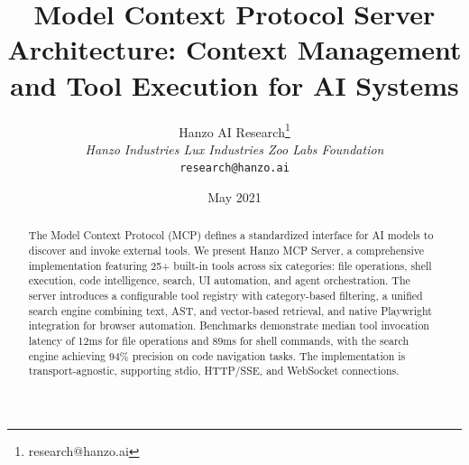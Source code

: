 \documentclass[11pt,twocolumn]{article}
\title{Model Context Protocol Server Architecture: Context Management and Tool Execution for AI Systems}
\author{Hanzo AI Research\thanks{research@hanzo.ai} \\ \textit{Hanzo Industries \quad Lux Industries \quad Zoo Labs Foundation} \\ \texttt{research@hanzo.ai}}
\date{May 2021}
\begin{document}
\hanzocoverpage

\begin{abstract}
The Model Context Protocol (MCP) defines a standardized interface for AI models to discover and invoke external tools. We present Hanzo MCP Server, a comprehensive implementation featuring 25+ built-in tools across six categories: file operations, shell execution, code intelligence, search, UI automation, and agent orchestration. The server introduces a configurable tool registry with category-based filtering, a unified search engine combining text, AST, and vector-based retrieval, and native Playwright integration for browser automation. Benchmarks demonstrate median tool invocation latency of 12ms for file operations and 89ms for shell commands, with the search engine achieving 94\% precision on code navigation tasks. The implementation is transport-agnostic, supporting stdio, HTTP/SSE, and WebSocket connections.
\end{abstract}









\end{document}
